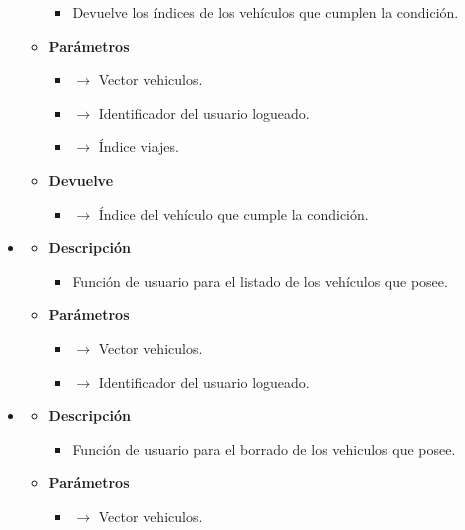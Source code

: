 \begin{itemize}
\begin{itemize}
\begin{itemize}
			\item Devuelve los índices de los vehículos que cumplen la condición.
		\end{itemize}
        \item \textbf{Parámetros}
		\begin{itemize}
			\item {} $\rightarrow$ Vector vehiculos.
            \item {} $\rightarrow$ Identificador del usuario logueado.
            \item {} $\rightarrow$ Índice viajes.
		\end{itemize}
        \item \textbf{Devuelve}
		\begin{itemize}
			\item {} $\rightarrow$ Índice del vehículo que cumple la condición.
		\end{itemize}
	\end{itemize}
    \item{}
	\begin{itemize}
		\item \textbf{Descripción}
        \begin{itemize}
			\item Función de usuario para el listado de los vehículos que posee.
		\end{itemize}
        \item \textbf{Parámetros}
		\begin{itemize}
			\item {} $\rightarrow$ Vector vehiculos.
            \item {} $\rightarrow$ Identificador del usuario logueado.
		\end{itemize}
	\end{itemize}
    \newpage
    \item{}
	\begin{itemize}
		\item \textbf{Descripción}
        \begin{itemize}
			\item Función de usuario para el borrado de los vehiculos que posee.
		\end{itemize}
        \item \textbf{Parámetros}
		\begin{itemize}
			\item {} $\rightarrow$ Vector vehiculos.

\end{itemize}
\end{itemize}
\end{itemize}
